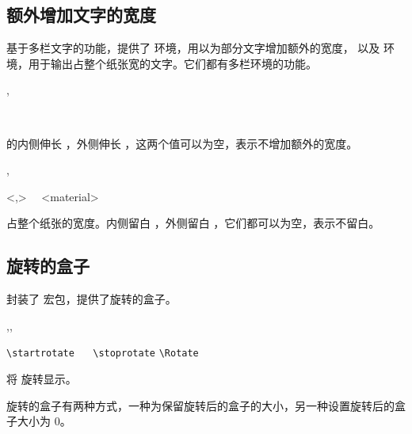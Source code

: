 \documentclass[twoside]{book}
\begin{document}
\subsection{额外增加文字的宽度}

基于多栏文字的功能，提供了  环境，用以为部分文字增加额外的宽度，
以及  环境，用于输出占整个纸张宽的文字。它们都有多栏环境的功能。

\begin{function}{\startextrawidth,\stopextrawidth}
  \begin{syntax}
    \V\startextrawidth {} 
    \V\startextrawidth {}  
    ~~
    \V\stopextrawidth
  \end{syntax}
 的内侧伸长 ，外侧伸长 ，这两个值可以为空，表示不增加额外的宽度。
\end{function}

\begin{function}{\startfullpagewidth,\stopfullpagewidth}
  \begin{syntax}
    \V\startfullpagewidth
    \V\startfullpagewidth {} \string<,\string>
    ~~<material>
    \V\stopfullpagewidth
  \end{syntax}
 占整个纸张的宽度。内侧留白 ，外侧留白 ，它们都可以为空，表示不留白。
\end{function}

\subsection{旋转的盒子}

\WhuTeX 封装了  宏包，提供了旋转的盒子。

\begin{function}{\startrotate,\stoprotate,\Rotate}
  \begin{syntax}
    \verb|\startrotate| 
    ~~
    \verb|\stoprotate|
    \endgraf \medskip 
    \verb|\Rotate|  
  \end{syntax}
将  旋转显示。
\end{function}

旋转的盒子有两种方式，一种为保留旋转后的盒子的大小，另一种设置旋转后的盒子大小为 0。
\end{document}

